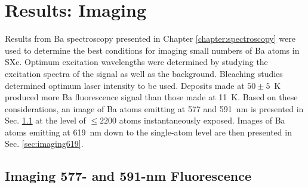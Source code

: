 \chapter{Results: Imaging}
\label{chapter:imaging}


Results from Ba spectroscopy presented in Chapter \ref{chapter:spectroscopy} were used to determine the best conditions for imaging small numbers of Ba atoms in SXe.  Optimum excitation wavelengths were determined by studying the excitation spectra of the signal as well as the background.  Bleaching studies determined optimum laser intensity to be used.  Deposits made at $50 \pm 5$~K produced more Ba fluorescence signal than those made at 11~K.  Based on these considerations, an image of Ba atoms emitting at 577 and 591~nm is presented in Sec. \ref{sec:imaging590and577} at the level of $\leq 2200$ atoms instantaneously exposed. Images of Ba atoms emitting at 619~nm down to the single-atom level are then presented in Sec. \ref{sec:imaging619}.






\section{Imaging 577- and 591-nm Fluorescence}
\label{sec:imaging590and577}

